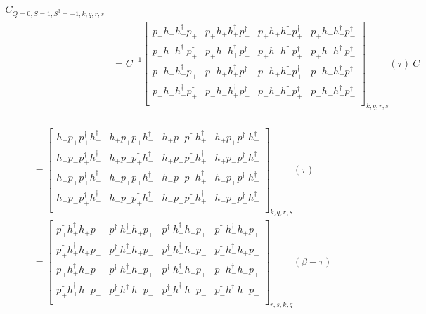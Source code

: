 \renewcommand{\cor}[4]{p_{#1}h_{#2}h^\dagger_{#3}p^\dagger_{#4}}
\renewcommand{\dcor}[4]{p_{#3}^\dagger h_{#4}^\dagger h_{#1} p_{#2}}

\begin{equation}
  \begin{aligned}
    C_{Q=0,S=1,S^3=-1;k,q,r,s} \\
    &= C^{-1} \left[ 
    {\begin{array}{cccc}
      \cor{+}{+}{+}{+} & \cor{+}{+}{+}{-} & \cor{+}{+}{-}{+} & \cor{+}{+}{-}{-} \\
      \cor{+}{-}{+}{+} & \cor{+}{-}{+}{-} & \cor{+}{-}{-}{+} & \cor{+}{-}{-}{-} \\
      \cor{-}{+}{+}{+} & \cor{-}{+}{+}{-} & \cor{-}{+}{-}{+} & \cor{-}{+}{-}{-} \\
      \cor{-}{-}{+}{+} & \cor{-}{-}{+}{-} & \cor{-}{-}{-}{+} & \cor{-}{-}{-}{-} \\
    \end{array} } \right]_{k,q,r,s} (\tau)\:C \\
  \end{aligned}
\end{equation}

\renewcommand{\cor}[4]{h_{#1}p_{#2}p^\dagger_{#3}h^\dagger_{#4}}

\begin{equation}
  \begin{aligned}  
    &=\left[ {\begin{array}{cccc}
      \cor{+}{+}{+}{+} & \cor{+}{+}{+}{-} & \cor{+}{+}{-}{+} & \cor{+}{+}{-}{-} \\
      \cor{+}{-}{+}{+} & \cor{+}{-}{+}{-} & \cor{+}{-}{-}{+} & \cor{+}{-}{-}{-} \\
      \cor{-}{+}{+}{+} & \cor{-}{+}{+}{-} & \cor{-}{+}{-}{+} & \cor{-}{+}{-}{-} \\
      \cor{-}{-}{+}{+} & \cor{-}{-}{+}{-} & \cor{-}{-}{-}{+} & \cor{-}{-}{-}{-} \\
    \end{array} } \right]_{k,q,r,s} (\tau) \\
    &=\left[ 
    {\begin{array}{cccc}
      \dcor{+}{+}{+}{+} & \dcor{+}{+}{+}{-} & \dcor{+}{+}{-}{+} & \dcor{+}{+}{-}{-} \\
      \dcor{+}{-}{+}{+} & \dcor{+}{-}{+}{-} & \dcor{+}{-}{-}{+} & \dcor{+}{-}{-}{-} \\
      \dcor{-}{+}{+}{+} & \dcor{-}{+}{+}{-} & \dcor{-}{+}{-}{+} & \dcor{-}{+}{-}{-} \\
      \dcor{-}{-}{+}{+} & \dcor{-}{-}{+}{-} & \dcor{-}{-}{-}{+} & \dcor{-}{-}{-}{-} \\
    \end{array} } \right]_{r,s,k,q} (\beta-\tau) \\
  \end{aligned}
\end{equation}


